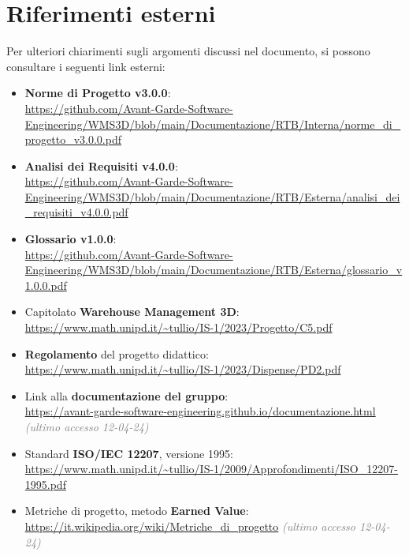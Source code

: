\newpage
\section{Riferimenti esterni} \label{sec:riferimenti_esterni}
Per ulteriori chiarimenti sugli argomenti discussi nel documento, si possono consultare i seguenti link esterni:
\begin{itemize}
    \item \textbf{Norme di Progetto v3.0.0}:\\
    \url{https://github.com/Avant-Garde-Software-Engineering/WMS3D/blob/main/Documentazione/RTB/Interna/norme_di_progetto_v3.0.0.pdf}
    \item \textbf{Analisi dei Requisiti v4.0.0}:\\
    \url{https://github.com/Avant-Garde-Software-Engineering/WMS3D/blob/main/Documentazione/RTB/Esterna/analisi_dei_requisiti_v4.0.0.pdf}
    \item \textbf{Glossario v1.0.0}:\\
    \url{https://github.com/Avant-Garde-Software-Engineering/WMS3D/blob/main/Documentazione/RTB/Esterna/glossario_v1.0.0.pdf}
    \item Capitolato \textbf{Warehouse Management 3D}:\\
    \url{https://www.math.unipd.it/~tullio/IS-1/2023/Progetto/C5.pdf}
    \item \textbf{Regolamento} del progetto didattico:\\
    \url{https://www.math.unipd.it/~tullio/IS-1/2023/Dispense/PD2.pdf}
    \item Link alla \textbf{documentazione del gruppo}:\\
    \url{https://avant-garde-software-engineering.github.io/documentazione.html} \textcolor{gray}{\textit{(ultimo accesso 12-04-24)}}
    \item Standard \textbf{ISO/IEC 12207}, versione 1995:\\
    \url{https://www.math.unipd.it/~tullio/IS-1/2009/Approfondimenti/ISO_12207-1995.pdf}
    \item Metriche di progetto, metodo \textbf{Earned Value}:\\
    \url{https://it.wikipedia.org/wiki/Metriche_di_progetto} \textcolor{gray}{\textit{(ultimo accesso 12-04-24)}}
\end{itemize}